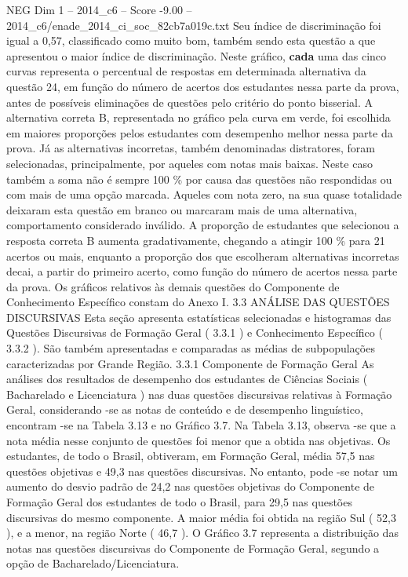 \begin{textsample}{NEG Dim 1 – 2014\_c6 – Score -9.00 – 2014\_c6/enade\_2014\_ci\_soc\_82cb7a019c.txt}
Seu índice de discriminação foi igual a 0,57, classificado como muito bom, também sendo esta questão a que apresentou o maior índice de discriminação.
Neste gráfico, \textbf{cada} uma das cinco curvas representa o percentual de respostas em determinada alternativa da questão 24, em função do número de acertos dos estudantes nessa parte da prova, antes de possíveis eliminações de questões pelo critério do ponto bisserial.
A alternativa correta B, representada no gráfico pela curva em verde, foi escolhida em maiores proporções pelos estudantes com desempenho melhor nessa parte da prova.
Já as alternativas incorretas, também denominadas distratores, foram selecionadas, principalmente, por aqueles com notas mais baixas.
Neste caso também a soma não é sempre 100 \% por causa das questões não respondidas ou com mais de uma opção marcada.
Aqueles com nota zero, na sua quase totalidade deixaram esta questão em branco ou marcaram mais de uma alternativa, comportamento considerado inválido.
A proporção de estudantes que selecionou a resposta correta B aumenta gradativamente, chegando a atingir 100 \% para 21 acertos ou mais, enquanto a proporção dos que escolheram alternativas incorretas decai, a partir do primeiro acerto, como função do número de acertos nessa parte da prova.
Os gráficos relativos às demais questões do Componente de Conhecimento Específico constam do Anexo I. 3.3 ANÁLISE DAS QUESTÕES DISCURSIVAS Esta seção apresenta estatísticas selecionadas e histogramas das Questões Discursivas de Formação Geral ( 3.3.1 ) e Conhecimento Específico ( 3.3.2 ).
São também apresentadas e comparadas as médias de subpopulações caracterizadas por Grande Região. 3.3.1 Componente de Formação Geral As análises dos resultados de desempenho dos estudantes de Ciências Sociais ( Bacharelado e Licenciatura ) nas duas questões discursivas relativas à Formação Geral, considerando -se as notas de conteúdo e de desempenho linguístico, encontram -se na Tabela 3.13 e no Gráfico 3.7.
Na Tabela 3.13, observa -se que a nota média nesse conjunto de questões foi menor que a obtida nas objetivas.
Os estudantes, de todo o Brasil, obtiveram, em Formação Geral, média 57,5 nas questões objetivas e 49,3 nas questões discursivas.
No entanto, pode -se notar um aumento do desvio padrão de 24,2 nas questões objetivas do Componente de Formação Geral dos estudantes de todo o Brasil, para 29,5 nas questões discursivas do mesmo componente.
A maior média foi obtida na região Sul ( 52,3 ), e a menor, na região Norte ( 46,7 ).
O Gráfico 3.7 representa a distribuição das notas nas questões discursivas do Componente de Formação Geral, segundo a opção de Bacharelado/Licenciatura.

\end{textsample}
